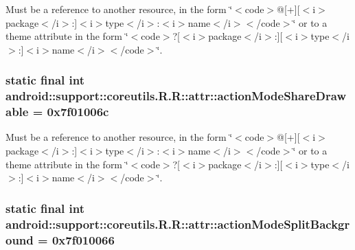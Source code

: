 Must be a reference to another resource, in the form \char`\"{}$<$code$>$@\mbox{[}+\mbox{]}\mbox{[}$<$i$>$package$<$/i$>$:\mbox{]}$<$i$>$type$<$/i$>$:$<$i$>$name$<$/i$>$$<$/code$>$\char`\"{} or to a theme attribute in the form \char`\"{}$<$code$>$?\mbox{[}$<$i$>$package$<$/i$>$:\mbox{]}\mbox{[}$<$i$>$type$<$/i$>$:\mbox{]}$<$i$>$name$<$/i$>$$<$/code$>$\char`\"{}. \hypertarget{classandroid_1_1support_1_1coreutils_1_1_r_1_1attr_4aa9e9dc3884e73546f550993b8e3ffa}{
\subsubsection[{actionModeShareDrawable}]{\setlength{\rightskip}{0pt plus 5cm}static final int android::support::coreutils.R.R::attr::actionModeShareDrawable = 0x7f01006c}}
\label{classandroid_1_1support_1_1coreutils_1_1_r_1_1attr_4aa9e9dc3884e73546f550993b8e3ffa}


Must be a reference to another resource, in the form \char`\"{}$<$code$>$@\mbox{[}+\mbox{]}\mbox{[}$<$i$>$package$<$/i$>$:\mbox{]}$<$i$>$type$<$/i$>$:$<$i$>$name$<$/i$>$$<$/code$>$\char`\"{} or to a theme attribute in the form \char`\"{}$<$code$>$?\mbox{[}$<$i$>$package$<$/i$>$:\mbox{]}\mbox{[}$<$i$>$type$<$/i$>$:\mbox{]}$<$i$>$name$<$/i$>$$<$/code$>$\char`\"{}. \hypertarget{classandroid_1_1support_1_1coreutils_1_1_r_1_1attr_9fe80f793942c0ed72df999de10a0d2b}{
\subsubsection[{actionModeSplitBackground}]{\setlength{\rightskip}{0pt plus 5cm}static final int android::support::coreutils.R.R::attr::actionModeSplitBackground = 0x7f010066}}
\label{classandroid_1_1support_1_1coreutils_1_1_r_1_1attr_9fe80f793942c0ed72df999de10a0d2b}


